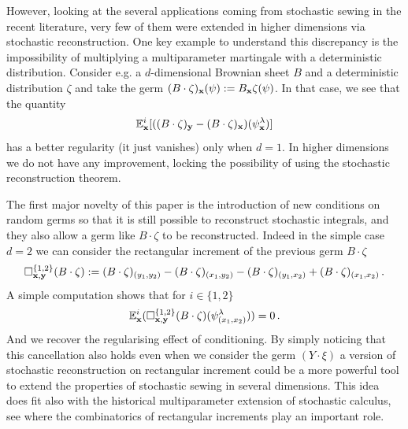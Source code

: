 \documentclass[12pt]{article}
\numberwithin{equation}{section}
\theoremstyle{plain}
\theoremstyle{definition}
\def\bE{\mathbb{E}}\def\bW{\mathbb{W}}
\def\fy{\mathbf y}\def\fz{\mathbf z}
\begin{document}
However, looking at the several applications  coming from stochastic sewing in the recent literature, very few of them were extended in higher dimensions via stochastic reconstruction.  One key example to understand this discrepancy is the impossibility of multiplying a multiparameter martingale with a deterministic distribution. Consider e.g. a $d$-dimensional Brownian sheet $B$  and a deterministic distribution $\zeta$ and take the germ $(B\cdot\zeta)_{\mathbf x}(\psi) := B_\mathbf x\zeta(\psi)$. In that case, we see that  the quantity 
\begin{equation}\label{eq:key_point}
    \bE^i_{\fx} [((B\cdot\zeta)_{\fy}- (B\cdot\zeta)_{\fx}) (\psi_\fx^\lambda) ]
\end{equation}
has a better regularity (it just vanishes) only when $d=1$. In higher dimensions we do not have any improvement, locking the possibility of using the stochastic reconstruction theorem. 

The first major novelty of this paper is the introduction of new conditions on random germs so that it is still possible to reconstruct stochastic integrals, and they also allow a germ like $B\cdot\zeta$ to be reconstructed. Indeed in the simple case $d=2$ we can consider the rectangular increment of the previous germ $B\cdot\zeta$
\[ \square^{\{1,2\}}_{\fx,\fy}(B\cdot\zeta):= (B\cdot\zeta)_{(y_1,y_2)}-(B\cdot\zeta)_{(x_1,y_2)} - (B\cdot\zeta)_{(y_1,x_2)}+  (B\cdot\zeta)_{(x_1, x_2)}\,.\]
A simple computation  shows that for $i \in \{1,2\}$ 
  \[\bE^i_{\fx} (\square^{\{1,2\}}_{\fx,\fy}(B\cdot\zeta)(\psi_{(x_1,x_2)}^\lambda))=0\,.\]
And we recover the regularising effect of conditioning.  By simply noticing that this cancellation also holds even when we consider the germ $(Y\cdot \xi)$  a version of stochastic reconstruction on rectangular increment could be a more powerful tool to extend the properties of stochastic sewing in several dimensions. This idea does fit also with the historical multiparameter extension of stochastic calculus, see \cite{Imkeller85, Khoshnevisan02, norris95} where the combinatorics of rectangular increments play an important role. 
\end{document}
